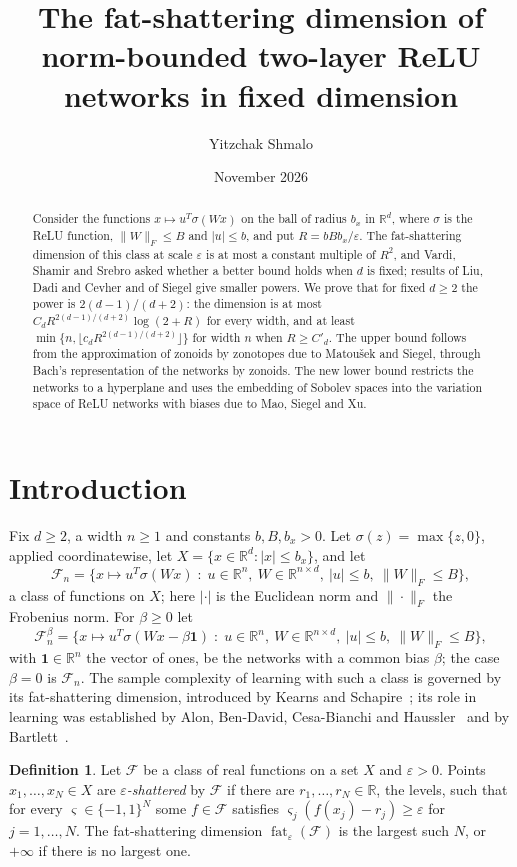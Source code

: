 \documentclass[11pt]{amsart}
\title[Fat-shattering of two-layer ReLU networks in fixed dimension]{The fat-shattering dimension of norm-bounded two-layer ReLU networks in fixed dimension}
\author{Yitzchak Shmalo}
\date{November 2026}
\theoremstyle{definition}
\newtheorem{definition}[theorem]{Definition}
\theoremstyle{remark}
\numberwithin{equation}{section}
\newcommand{\RR}{\mathbb{R}}
\newcommand{\cF}{\mathcal{F}}
\newcommand{\fat}{\operatorname{fat}}
\begin{document}
\begin{abstract}
Consider the functions $x\mapsto u^{T}\sigma(Wx)$ on the ball of radius $b_x$ in $\RR^d$, where $\sigma$ is the ReLU function, $\|W\|_F\le B$ and $|u|\le b$, and put $R=bBb_x/\varepsilon$. The fat-shattering dimension of this class at scale $\varepsilon$ is at most a constant multiple of $R^2$, and Vardi, Shamir and Srebro asked whether a better bound holds when $d$ is fixed; results of Liu, Dadi and Cevher and of Siegel give smaller powers. We prove that for fixed $d\ge2$ the power is $2(d-1)/(d+2)$: the dimension is at most $C_dR^{2(d-1)/(d+2)}\log(2+R)$ for every width, and at least $\min\{n,\lfloor c_dR^{2(d-1)/(d+2)}\rfloor\}$ for width $n$ when $R\ge C'_d$. The upper bound follows from the approximation of zonoids by zonotopes due to Matou\v{s}ek and Siegel, through Bach's representation of the networks by zonoids. The new lower bound restricts the networks to a hyperplane and uses the embedding of Sobolev spaces into the variation space of ReLU networks with biases due to Mao, Siegel and Xu.
\end{abstract}
\maketitle

\section{Introduction}\label{sec:intro}

Fix $d\ge2$, a width $n\ge1$ and constants $b,B,b_x>0$. Let $\sigma(z)=\max\{z,0\}$, applied coordinatewise, let $X=\{x\in\RR^d:|x|\le b_x\}$, and let
\[
\cF_n=\bigl\{x\mapsto u^{T}\sigma(Wx)\;:\;u\in\RR^n,\ W\in\RR^{n\times d},\ |u|\le b,\ \|W\|_F\le B\bigr\},
\]
a class of functions on $X$; here $|\cdot|$ is the Euclidean norm and $\|\cdot\|_F$ the Frobenius norm. For $\beta\ge0$ let
\[
\cF_n^{\beta}=\bigl\{x\mapsto u^{T}\sigma(Wx-\beta\mathbf 1)\;:\;u\in\RR^n,\ W\in\RR^{n\times d},\ |u|\le b,\ \|W\|_F\le B\bigr\},
\]
with $\mathbf 1\in\RR^n$ the vector of ones, be the networks with a common bias $\beta$; the case $\beta=0$ is $\cF_n$. The sample complexity of learning with such a class is governed by its fat-shattering dimension, introduced by Kearns and Schapire~\cite{KS}; its role in learning was established by Alon, Ben-David, Cesa-Bianchi and Haussler~\cite{ABCH} and by Bartlett~\cite{Bartlett98}.

\begin{definition}
Let $\cF$ be a class of real functions on a set $X$ and $\varepsilon>0$. Points $x_1,\dots,x_N\in X$ are \emph{$\varepsilon$-shattered} by $\cF$ if there are $r_1,\dots,r_N\in\RR$, the levels, such that for every $\varsigma\in\{-1,1\}^N$ some $f\in\cF$ satisfies $\varsigma_j(f(x_j)-r_j)\ge\varepsilon$ for $j=1,\dots,N$. The fat-shattering dimension $\fat_\varepsilon(\cF)$ is the largest such $N$, or $+\infty$ if there is no largest one.
\end{definition}
\end{document}
